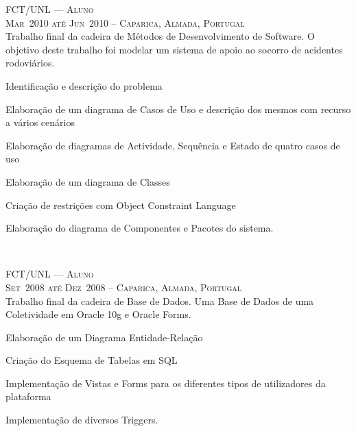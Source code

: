\documentclass[a4paper,fontsize=10pt]{scrartcl} %
\begin{document}
\begin{minipage}[t]{0.5\textwidth}
\textsc{FCT/UNL --- Aluno}\\
\small\textsc{Mar~2010 até Jun~2010 -- Caparica, Almada, Portugal}\\ \normalsize
Trabalho final da cadeira de Métodos de Desenvolvimento de Software.
O objetivo deste trabalho foi modelar um sistema de apoio ao socorro de acidentes rodoviários.\\
\begin{inparaitem}
	\item[] Identificação e descrição do problema
	\item Elaboração de um diagrama de Casos de Uso e descrição dos mesmos com recurso a vários cenários
	\item Elaboração de diagramas de Actividade, Sequência e Estado de quatro casos de uso
	\item Elaboração de um diagrama de Classes
	\item Criação de restrições com Object Constraint Language
	\item Elaboração do diagrama de Componentes e Pacotes do sistema.
\end{inparaitem}
\\\par

\textsc{FCT/UNL --- Aluno}\\
\small\textsc{Set~2008 até Dez~2008 -- Caparica, Almada, Portugal}\\ \normalsize
Trabalho final da cadeira de Base de Dados. Uma Base de Dados de uma Coletividade em Oracle 10g e Oracle Forms.\\
\begin{inparaitem} 
	\item[] Elaboração de um Diagrama Entidade-Relação
	\item Criação do Esquema de Tabelas em SQL
	\item Implementação de Vistas e Forms para os diferentes tipos de utilizadores da plataforma
	\item Implementação de diversos Triggers.
\end{inparaitem}
\\\par


\end{minipage}
\end{document}

